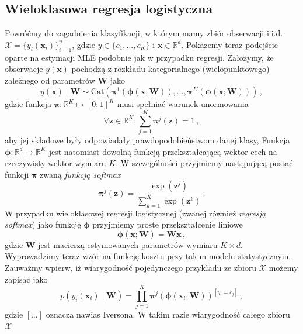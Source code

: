 \documentclass{myclass}
\numberwithin{equation}{subsection}
\begin{document}
\subsection{Wieloklasowa regresja logistyczna}

Powróćmy do zagadnienia klasyfikacji, w którym mamy zbiór obserwacji i.i.d. \(\mathcal{X} =
\{y_i(\bm{x}_i)\}_{i=1}^n\), gdzie \(y \in \{c_1,\ldots,c_K\}\) i \(\bm{x} \in \mathbb{R}^d\).
Pokażemy teraz podejście oparte na estymacji MLE podobnie jak w przypadku regresji. Założymy, że
obserwacje \(y(\bm{x})\) pochodzą z rozkładu kategorialnego (wielopunktowego) zależnego od
parametrów \(\bm{W}\) jako
\begin{equation}
    y(\bm{x}) \mid \bm{W} \sim \mathrm{Cat}\left(\bm{\pi}^1(\bm{\phi}(\bm{x}; \bm{W})), \ldots, \bm{\pi}^K(\bm{\phi}(\bm{x}; \bm{W}))\right)\,,
\end{equation}
gdzie funkcja \(\bm{\pi}: \mathbb{R}^K \mapsto [0;1]^K\) musi spełniać warunek unormowania
\begin{equation*}
    \forall \bm{z}\in\mathbb{R}^K: \sum_{j=1}^K \bm{\pi}^j(\bm{z}) = 1\,,
\end{equation*}
aby jej składowe były odpowiadały prawdopodobieństwom danej klasy, Funkcja \(\bm{\phi}: \mathbb{R}^d
\mapsto \mathbb{R}^K\) jest natomiast dowolną funkcją przekształcającą wektor cech na rzeczywisty
wektor wymiaru \(K\). W szczególności przyjmiemy następującą postać funkcji \(\bm{\pi}\) zwaną
\emph{funkcją softmax}
\begin{equation}\boxed{
    \bm{\pi}^j(\bm{z}) = \frac{\exp\left(\bm{z}^j\right)}{\sum_{k=1}^K \exp\left(\bm{z}^k\right)}\,.
}\end{equation}
W przypadku wieloklasowej regresji logistycznej (zwanej również \emph{regresją softmax}) jako
funkcję \(\bm{\phi}\) przyjmiemy proste przekształcenie liniowe
\begin{equation}
    \bm{\phi}(\bm{x}; \bm{W}) = \bm{W}\bm{x}\,,
\end{equation} 
gdzie \(\bm{W}\) jest macierzą estymowanych parametrów wymiaru \(K \times d\). Wyprowadzimy teraz
wzór na funkcję kosztu przy takim modelu statystycznym. Zauważmy wpierw, iż wiarygodność
pojedynczego przykładu ze zbioru \(\mathcal{X}\) możemy zapisać jako
\begin{equation}
    p(y_i(\bm{x}_i) \mid \bm{W}) = \prod_{j=1}^K \bm{\pi}^j\left(\bm{\phi}(\bm{x}_i; \bm{W})\right)^{[y_i = c_j]}\,,
\end{equation}
gdzie \([\ldots]\) oznacza nawias Iversona. W takim razie wiarygodność całego zbioru \(\mathcal{X}\)
\end{document}
